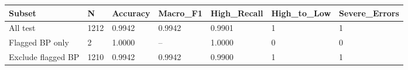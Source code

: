 \begin{tabular}{lllllll}
\toprule
Subset & N & Accuracy & Macro\_F1 & High\_Recall & High\_to\_Low & Severe\_Errors \\
\midrule
All test & 1212 & 0.9942 & 0.9942 & 0.9901 & 1 & 1 \\
Flagged BP only & 2 & 1.0000 & -- & 1.0000 & 0 & 0 \\
Exclude flagged BP & 1210 & 0.9942 & 0.9942 & 0.9900 & 1 & 1 \\
\bottomrule
\end{tabular}